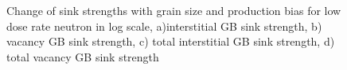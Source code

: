 \documentclass[a4paper]{article}
\begin{document}
\begin{figure}[h!]
        \qquad
        \caption{Change of sink strengths with grain size and production bias for low dose rate neutron in log scale, a)interstitial GB sink strength, b) vacancy GB sink strength, c) total interstitial GB sink strength, d) total vacancy GB sink strength}
        \label{figure:sink_strength_moose_neutron_3D}
      \end{figure}
\end{document}
